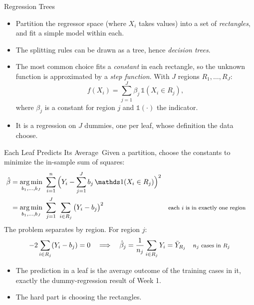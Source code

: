 \documentclass[aspectratio=169,11pt,xcolor=dvipsnames]{beamer}
\DeclareMathOperator*{\argminop}{arg\,min}
\newcommand{\argmin}{\argminop\limits}
\newcommand{\core}{\,\raisebox{0.6pt}{\textcolor{corestar}{$\bigstar$}}}
\begin{document}
\begin{frame}{Regression Trees\core}
\begin{itemize}\itemsep4pt
  \item Partition the regressor space (where $X_i$ takes values) into a set of
        \textit{rectangles}, and fit a simple model within each.
  \item The splitting rules can be drawn as a tree, hence \textit{decision trees}.
  \item The most common choice fits a \emph{constant} in each rectangle, so the
        unknown function is approximated by a \textit{step function}. With $J$
        regions $R_1, \dots, R_J$:
  \[
    f(X_i) = \sum_{j=1}^J \beta_j\,\mathds 1(X_i \in R_j),
  \]
        where $\beta_j$ is a constant for region $j$ and $\mathds 1(\cdot)$ the indicator.
  \item It is a regression on $J$ dummies, one per leaf, whose definition the data choose.
\end{itemize}
\end{frame}

\begin{frame}{Each Leaf Predicts Its Average\core}
Given a partition, choose the constants to minimize the in-sample sum of squares:
\begin{align*}
  \hat\beta &= \argmin_{b_1,\dots,b_J}\ \sum_{i=1}^n\Big(Y_i - \sum_{j=1}^J b_j\,\mathds 1(X_i\in R_j)\Big)^2 \\
  &= \argmin_{b_1,\dots,b_J}\ \sum_{j=1}^J\ \sum_{i\in R_j}\big(Y_i - b_j\big)^2
   && \text{\footnotesize each $i$ is in exactly one region}
\end{align*}
The problem separates by region. For region $j$:
\begin{align*}
  -2\sum_{i\in R_j}(Y_i - b_j) = 0
  \quad\Longrightarrow\quad
  \hat\beta_j = \frac{1}{n_j}\sum_{i\in R_j} Y_i = \bar Y_{R_j}
   && \text{\footnotesize $n_j$ cases in $R_j$}
\end{align*}
\begin{itemize}\itemsep3pt
  \item The prediction in a leaf is the average outcome of the training cases in it,
        exactly the dummy-regression result of Week 1.
  \item The hard part is choosing the rectangles.
\end{itemize}
\end{frame}
\end{document}
